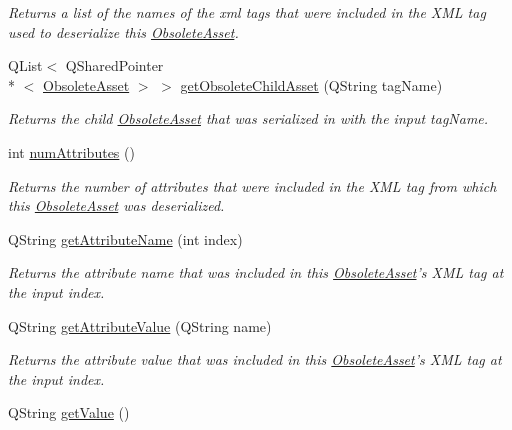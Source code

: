 \begin{DoxyCompactItemize}
\begin{DoxyCompactList}\small\item\em Returns a list of the names of the xml tags that were included in the X\-M\-L tag used to deserialize this \hyperlink{class_picto_1_1_obsolete_asset}{Obsolete\-Asset}. \end{DoxyCompactList}\item 
Q\-List$<$ Q\-Shared\-Pointer\\*
$<$ \hyperlink{class_picto_1_1_obsolete_asset}{Obsolete\-Asset} $>$ $>$ \hyperlink{class_picto_1_1_obsolete_asset_a562aa6312d8505809f7150882c9f2e5d}{get\-Obsolete\-Child\-Asset} (Q\-String tag\-Name)
\begin{DoxyCompactList}\small\item\em Returns the child \hyperlink{class_picto_1_1_obsolete_asset}{Obsolete\-Asset} that was serialized in with the input tag\-Name. \end{DoxyCompactList}\item 
\hypertarget{class_picto_1_1_obsolete_asset_afde5b3db6920d338802d609fdce021be}{int \hyperlink{class_picto_1_1_obsolete_asset_afde5b3db6920d338802d609fdce021be}{num\-Attributes} ()}\label{class_picto_1_1_obsolete_asset_afde5b3db6920d338802d609fdce021be}

\begin{DoxyCompactList}\small\item\em Returns the number of attributes that were included in the X\-M\-L tag from which this \hyperlink{class_picto_1_1_obsolete_asset}{Obsolete\-Asset} was deserialized. \end{DoxyCompactList}\item 
Q\-String \hyperlink{class_picto_1_1_obsolete_asset_a2c13b775185c9398f5adb5a6f897f1f4}{get\-Attribute\-Name} (int index)
\begin{DoxyCompactList}\small\item\em Returns the attribute name that was included in this \hyperlink{class_picto_1_1_obsolete_asset}{Obsolete\-Asset}'s X\-M\-L tag at the input index. \end{DoxyCompactList}\item 
Q\-String \hyperlink{class_picto_1_1_obsolete_asset_a09aeef81dbc64bcbbf34b2ee991f76fb}{get\-Attribute\-Value} (Q\-String name)
\begin{DoxyCompactList}\small\item\em Returns the attribute value that was included in this \hyperlink{class_picto_1_1_obsolete_asset}{Obsolete\-Asset}'s X\-M\-L tag at the input index. \end{DoxyCompactList}\item 
\hypertarget{class_picto_1_1_obsolete_asset_a495b9dc57f02784d6142908efa50c6c6}{Q\-String \hyperlink{class_picto_1_1_obsolete_asset_a495b9dc57f02784d6142908efa50c6c6}{get\-Value} ()}\label{class_picto_1_1_obsolete_asset_a495b9dc57f02784d6142908efa50c6c6}


\end{DoxyCompactItemize}
